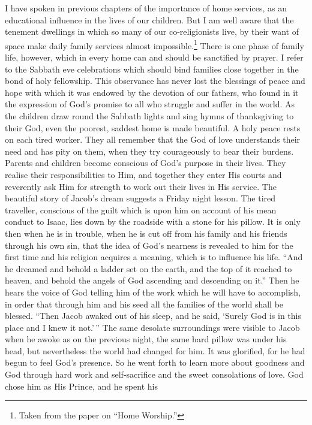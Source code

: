 I have spoken in previous chapters of
the importance of home services, as an
educational influence in the lives of our
children. But I am well aware that the
tenement dwellings in which so many of our
co-religionists live, by their want of space
make daily family services almost impossible.\footnote{Taken
from the paper on “Home Worship.”}
There is one phase of family life, however,
which in every home can and should be sanctified
by prayer. I refer to the Sabbath eve
celebrations which should bind families close
together in the bond of holy fellowship.
This observance has never lost the blessings
of peace and hope with which it was
endowed by the devotion of our fathers, who
found in it the expression of God’s promise
to all who struggle and suffer in the world.
As the children draw round the Sabbath
lights and sing hymns of thanksgiving to
their God, even the poorest, saddest home
is made beautiful. A holy peace rests on
each tired worker. They all remember
that the God of love understands their need
and has pity on them, when they try
courageously to bear their burdens. Parents
and children become conscious of God’s
purpose in their lives. They realise their
responsibilities to Him, and together they
enter His courts and reverently ask Him
for strength to work out their lives in His
service. The beautiful story of Jacob's
dream suggests a Friday night lesson. The
tired traveller, conscious of the guilt which
is upon him on account of his mean conduct
to Isaac, lies down by the roadside with a
stone for his pillow. It is only then when
he is in trouble, when he is cut off from his
family and his friends through his own
sin, that the idea of God’s nearness is
revealed to him for the first time and his
religion acquires a meaning, which is to
influence his life. “And he dreamed and
behold a ladder set on the earth, and the
top of it reached to heaven, and behold the
angels of God ascending and descending on
it.” Then he hears the voice of God telling
him of the work which he will have to
accomplish, in order that through him and
his seed all the families of the world shall
be blessed. “Then Jacob awaked out of
his sleep, and he said, ‘Surely God is in
this place and I knew it not.’\,” The same
desolate surroundings were visible to Jacob
when he awoke as on the previous night,
the same hard pillow was under his head,
but nevertheless the world had changed
for him. It was glorified, for he had
begun to feel God’s presence. So he went
forth to learn more about goodness and
God through hard work and self-sacrifice
and the sweet consolations of love. God
chose him as His Prince, and he spent his

